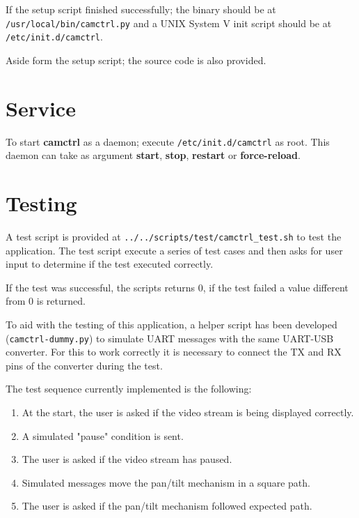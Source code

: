 If the setup script finished successfully; the binary should be at\\
\texttt{/usr/local/bin/camctrl.py} and a UNIX System V init script should be
at\\ \texttt{/etc/init.d/camctrl}.

Aside form the setup script; the source code is also provided.

\section{Service} \label{sec:service}
To start \textbf{camctrl} as a daemon; execute \texttt{/etc/init.d/camctrl}
as root. This daemon can take as argument \textbf{start}, \textbf{stop},
\textbf{restart} or \textbf{force-reload}.

\section{Testing}
A test script is provided at \texttt{../../scripts/test/camctrl\_test.sh} to
test the application. The test script execute a series of test cases and then
asks for user input to determine if the test executed correctly.

If the test was successful, the scripts returns 0, if the test failed a value
different from 0 is returned.

To aid with the testing of this application, a helper script has been developed
(\texttt{camctrl-dummy.py}) to simulate UART messages with the same UART-USB
converter. For this to work correctly it is necessary to connect the TX and RX
pins of the converter during the test.

The test sequence currently implemented is the following:

   \begin{enumerate}
      \item At the start, the user is asked if the video stream is being
         displayed correctly.
      \item A simulated "pause" condition is sent.
      \item The user is asked if the video stream has paused.
      \item Simulated messages move the pan/tilt mechanism in a square path.
      \item The user is asked if the pan/tilt mechanism followed expected path.
   \end{enumerate}

\pagebreak
